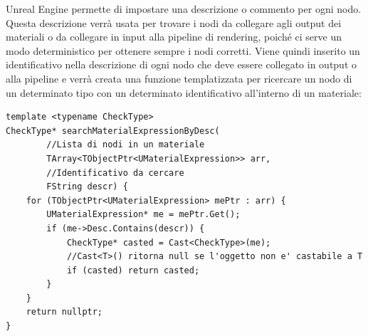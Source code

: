 \documentclass[main.tex]{subfiles}
\begin{document}
Unreal Engine permette di impostare una descrizione o commento per ogni nodo. Questa descrizione verrà usata per trovare i nodi da collegare agli output dei materiali o da collegare in input alla pipeline di rendering, poiché ci serve un modo deterministico per ottenere sempre i nodi corretti. Viene quindi inserito un identificativo nella descrizione di ogni nodo che deve essere collegato in output o alla pipeline e verrà creata una funzione templatizzata per ricercare un nodo di un determinato tipo con un determinato identificativo all'interno di un materiale:
\newline
\begin{lstlisting}
template <typename CheckType>
CheckType* searchMaterialExpressionByDesc(
        //Lista di nodi in un materiale
        TArray<TObjectPtr<UMaterialExpression>> arr,
        //Identificativo da cercare
        FString descr) {
    for (TObjectPtr<UMaterialExpression> mePtr : arr) {
        UMaterialExpression* me = mePtr.Get();
        if (me->Desc.Contains(descr)) {
            CheckType* casted = Cast<CheckType>(me);
            //Cast<T>() ritorna null se l'oggetto non e' castabile a T
            if (casted) return casted;
        }
    }
    return nullptr;
}
\end{lstlisting}
\end{document}
